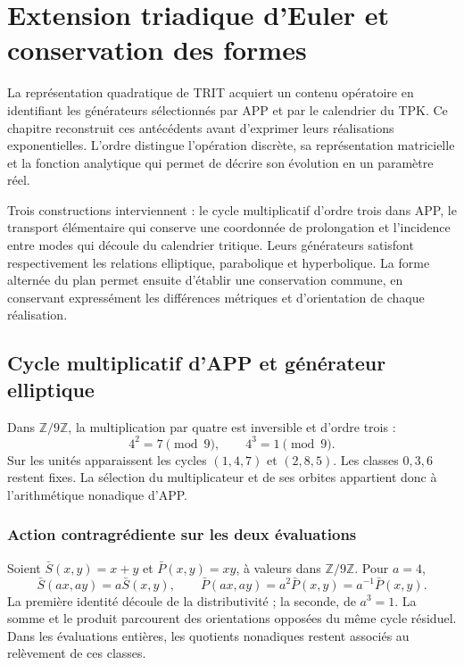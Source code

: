 \section{Extension triadique d’Euler et conservation des formes}
\label{eul:capitulo}

La représentation quadratique de TRIT acquiert un contenu opératoire en
identifiant les générateurs sélectionnés par APP et par le calendrier du
TPK. Ce chapitre reconstruit ces antécédents avant d’exprimer leurs
réalisations exponentielles. L’ordre distingue l’opération discrète,
sa représentation matricielle et la fonction analytique qui permet de décrire
son évolution en un paramètre réel.

Trois constructions interviennent : le cycle multiplicatif d’ordre trois
dans APP, le transport élémentaire qui conserve une coordonnée de
prolongation et l’incidence entre modes qui découle du calendrier
tritique. Leurs générateurs satisfont respectivement les relations
elliptique, parabolique et hyperbolique. La forme alternée du plan permet
ensuite d’établir une conservation commune, en conservant expressément les différences métriques
et d’orientation de chaque réalisation.

\subsection{Cycle multiplicatif d’APP et générateur elliptique}
\label{eul:coxeter}

Dans \(\mathbb Z/9\mathbb Z\), la multiplication par quatre est inversible
et d’ordre trois :
\[
 4^2=7\pmod9,\qquad 4^3=1\pmod9.
\]
Sur les unités apparaissent les cycles \((1,4,7)\) et \((2,8,5)\).
Les classes \(0,3,6\) restent fixes. La sélection du multiplicateur et de ses
orbites appartient donc à l’arithmétique nonadique d’APP.

\subsubsection{Action contragrédiente sur les deux évaluations}

Soient \(\bar S(x,y)=x+y\) et \(\bar P(x,y)=xy\), à valeurs dans
\(\mathbb Z/9\mathbb Z\). Pour \(a=4\),
\begin{equation}
 \bar S(ax,ay)=a\bar S(x,y),\qquad
 \bar P(ax,ay)=a^2\bar P(x,y)=a^{-1}\bar P(x,y).
\label{eul:eq:contragrediente}
\end{equation}
La première identité découle de la distributivité ; la seconde, de
\(a^3=1\). La somme et le produit parcourent des orientations opposées du
même cycle résiduel. Dans les évaluations entières, les quotients
nonadiques restent associés au relèvement de ces classes.

